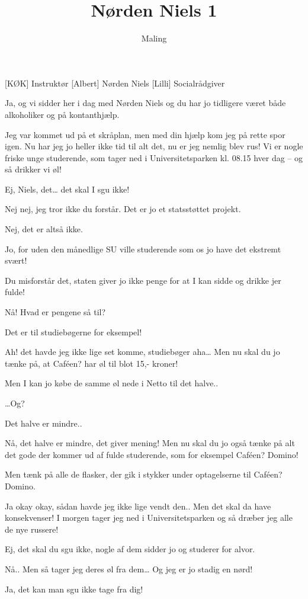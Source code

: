 \documentclass[a4paper,11pt]{article}
\title{Nørden Niels 1}
\author{Maling}
\begin{document}
\maketitle

\begin{roles}
[KØK] Instruktør
[Albert] Nørden Niels
[Lilli] Socialrådgiver
\end{roles}

\begin{sketch}
 Ja, og vi sidder her i dag med Nørden Niels og du har jo tidligere været både alkoholiker og på kontanthjælp.

 Jeg var kommet ud på et skråplan, men med din hjælp kom jeg på rette spor igen. Nu har jeg jo heller ikke tid til alt det, nu er jeg nemlig blev rus! Vi er nogle friske unge studerende, som tager ned i Universitetsparken kl. 08.15 hver dag – og så drikker vi øl!

 Ej, Niels, det… det skal I sgu ikke!

 Nej nej, jeg tror ikke du forstår. Det er jo et statsstøttet projekt.

 Nej, det er altså ikke.

 Jo, for uden den månedlige SU ville studerende som os jo have det ekstremt svært!

 Du misforstår det, staten giver jo ikke penge for at I kan sidde og drikke jer fulde!

 Nå! Hvad er pengene så til?

 Det er til studiebøgerne for eksempel!

 Ah! det havde jeg ikke lige set komme, studiebøger aha… Men nu skal du jo tænke på, at Caféen? har øl til blot 15,- kroner!

 Men I kan jo købe de samme øl nede i Netto til det halve..

 …Og?

 Det halve er mindre..

 Nå, det halve er mindre, det giver mening! Men nu skal du jo også tænke på alt det gode der kommer ud af fulde studerende, som for eksempel Caféen? Domino!

 Men tænk på alle de flasker, der gik i stykker under optagelserne til Caféen? Domino.

 Ja okay okay, sådan havde jeg ikke lige vendt den.. Men det skal da have konsekvenser! I morgen tager jeg ned i Universitetsparken og så dræber jeg alle de nye russere!

 Ej, det skal du sgu ikke, nogle af dem sidder jo og studerer for alvor.

 Nå.. Men så tager jeg deres øl fra dem… Og jeg er jo stadig en nørd!

 Ja, det kan man sgu ikke tage fra dig! 

\end{sketch}
\end{document}
